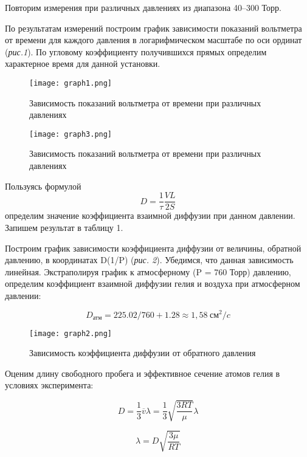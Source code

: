 \documentclass[a4paper,12pt]{article}
\theoremstyle{plain} %
\theoremstyle{definition} %
\theoremstyle{remark} %
\begin{document}
        Повторим измерения при различных давлениях из диапазона 40--300 Торр.

        По результатам измерений построим график зависимости показаний вольтметра от времени для каждого давления в логарифмическом масштабе по оси ординат (\textit{рис.1}). По угловому коэффициенту получившихся прямых определим характерное время для данной установки.
    
        \begin{figure}
        \centering
        \texttt{[image: graph1.png]} 
        \caption{Зависимость показаний вольтметра от времени при различных давлениях}
        \end{figure}
        \begin{figure}
        \centering
        \texttt{[image: graph3.png]} 
        \caption{Зависимость показаний вольтметра от времени при различных давлениях}
        \end{figure}

        Пользуясь формулой 
        \begin{equation}
            D = \dfrac{1}{\tau}\dfrac{VL}{2S}
        \end{equation}
        определим значение коэффициента взаимной диффузии при данном давлении. Запишем результат в таблицу 1.

        Построим график зависимости коэффициента диффузии от величины, обратной давлению, в координатах D(1/P) (\textit{рис. 2}). Убедимся, что данная зависимость линейная. Экстраполируя график к атмосферному (P = 760 Торр) давлению, определим коэффициент взаимной диффузии гелия и воздуха при атмосферном давлении:

        \[ D_\textit{атм} = 225.02/760 + 1.28 \approx 1,58\hspace{3pt} \textit{см}^2/\textit{c} \]
    
        \begin{figure}
        \centering
        \texttt{[image: graph2.png]} 
        \caption{Зависимость коэффициента диффузии от обратного давления}
        \end{figure}

        Оценим длину свободного пробега и эффективное сечение атомов гелия в условиях эксперимента:
        
        \[D = \frac{1}{3} \overline{v}\lambda = \frac{1}{3} \sqrt{\frac{3RT}{\mu}}\lambda \]
        
        \[\lambda = D\sqrt{\frac{3\mu}{RT}}\]
        
\end{document}
